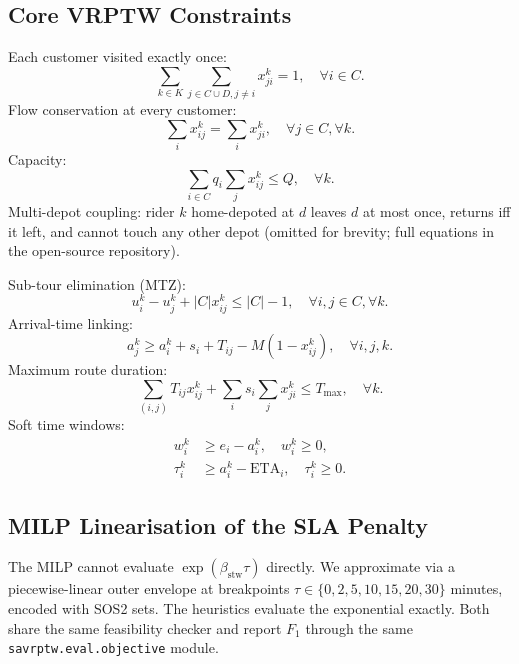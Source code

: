 \documentclass{ieeeaccess}
\begin{document}
\subsection{Core VRPTW Constraints}
Each customer visited exactly once:
\begin{equation}
\sum_{k \in K} \sum_{j \in C \cup D, j \neq i} x_{ji}^k = 1,
\quad \forall i \in C. \label{eq:visit}
\end{equation}
Flow conservation at every customer:
\begin{equation}
\sum_{i} x_{ij}^k = \sum_{i} x_{ji}^k, \quad \forall j \in C, \forall k. \label{eq:flow}
\end{equation}
Capacity:
\begin{equation}
\sum_{i \in C} q_i \sum_{j} x_{ij}^k \leq Q, \quad \forall k. \label{eq:cap}
\end{equation}
Multi-depot coupling: rider $k$ home-depoted at $d$ leaves $d$ at most
once, returns iff it left, and cannot touch any other depot (omitted
for brevity; full equations in the open-source repository).

Sub-tour elimination (MTZ):
\begin{equation}
u_i^k - u_j^k + |C| x_{ij}^k \leq |C| - 1, \quad \forall i, j \in C, \forall k. \label{eq:mtz}
\end{equation}
Arrival-time linking:
\begin{equation}
a_j^k \geq a_i^k + s_i + T_{ij} - M (1 - x_{ij}^k), \quad \forall i, j, k. \label{eq:link}
\end{equation}
Maximum route duration:
\begin{equation}
\sum_{(i,j)} T_{ij} x_{ij}^k + \sum_{i} s_i \sum_j x_{ji}^k \leq T_{\max}, \quad \forall k. \label{eq:Tmax}
\end{equation}
Soft time windows:
\begin{align}
w_i^k &\geq e_i - a_i^k, \quad w_i^k \geq 0, \label{eq:early} \\
\tau_i^k &\geq a_i^k - \mathrm{ETA}_i, \quad \tau_i^k \geq 0. \label{eq:late}
\end{align}

\subsection{MILP Linearisation of the SLA Penalty}
The MILP cannot evaluate $\exp(\beta_{\text{stw}} \tau)$ directly. We
approximate via a piecewise-linear outer envelope at breakpoints
$\tau \in \{0, 2, 5, 10, 15, 20, 30\}$ minutes, encoded with SOS2 sets.
The heuristics evaluate the exponential exactly. Both share the
same feasibility checker and report $F_1$ through the same
\texttt{savrptw.eval.objective} module.
\end{document}
